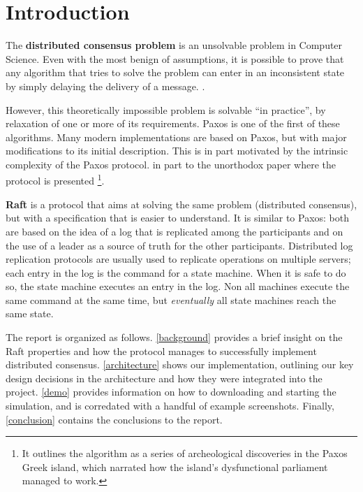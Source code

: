 \section{Introduction}
The \textbf{distributed consensus problem} is an unsolvable problem in Computer Science. Even with the most benign of assumptions, it is possible to prove that any algorithm that tries to solve the problem can enter in an inconsistent state by simply delaying the delivery of a message. \cite{fischer_impossibility_nodate}.

However, this theoretically impossible problem is solvable ``in practice'', by relaxation of one or more of its requirements. Paxos \cite{lamport_part-time_1998} is one of the first of these algorithms. Many modern implementations are based on Paxos, but with major modifications to its initial description. This is in part motivated by the intrinsic complexity of the Paxos protocol. in part to the unorthodox paper where the protocol is presented \footnote{It outlines the algorithm as a series of archeological discoveries in the Paxos Greek island, which narrated how the island's dysfunctional parliament managed to work.}.

\textbf{Raft} \cite{ongaro_search_nodate} is a protocol that aims at solving the same problem (distributed consensus), but with a specification that is easier to understand. It is similar to Paxos: both are based on the idea of a log that is replicated among the participants and on the use of a leader as a source of truth for the other participants. Distributed log replication protocols are usually used to replicate operations on multiple servers; each entry in the log is the command for a state machine. When it is safe to do so, the state machine executes an entry in the log. Non all machines execute the same command at the same time, but \textit{eventually} all state machines reach the same state.

The report is organized as follows. \cref{background} provides a brief insight on the Raft properties and how the protocol manages to successfully implement distributed consensus. \cref{architecture} shows our implementation, outlining our key design decisions in the architecture and how they were integrated into the project. \cref{demo} provides information on how to downloading and starting the simulation, and is corredated with a handful of example screenshots. Finally, \cref{conclusion} contains the conclusions to the report.

\clearpage
\newpage
